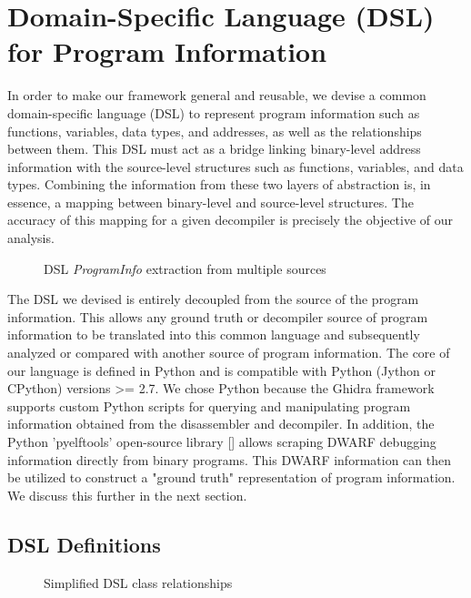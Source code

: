 \section{Domain-Specific Language (DSL) for Program Information}

In order to make our framework general and reusable, we devise a common domain-specific language (DSL) to represent program information such as functions, variables, data types, and addresses, as well as the relationships between them. This DSL must act as a bridge linking binary-level address information with the source-level structures such as functions, variables, and data types. Combining the information from these two layers of abstraction is, in essence, a mapping between binary-level and source-level structures. The accuracy of this mapping for a given decompiler is precisely the objective of our analysis.

\begin{figure}[ht]
    \centering
    \scalebox{0.8}{
        
    }
    \caption{DSL \emph{ProgramInfo} extraction from multiple sources}
    \label{fig:proginfo-sources}
\end{figure}

The DSL we devised is entirely decoupled from the source of the program information. This allows any ground truth or decompiler source of program information to be translated into this common language and subsequently analyzed or compared with another source of program information. The core of our language is defined in Python and is compatible with Python (Jython or CPython) versions >= 2.7. We chose Python because the Ghidra framework supports custom Python scripts for querying and manipulating program information obtained from the disassembler and decompiler. In addition, the Python 'pyelftools' open-source library [] allows scraping DWARF debugging information directly from binary programs. This DWARF information can then be utilized to construct a "ground truth" representation of program information. We discuss this further in the next section.

\subsection{DSL Definitions}

\begin{figure}[ht]
    \centering
    \scalebox{0.4}{
        
    }
    \caption{Simplified DSL class relationships}
    \label{fig:dsl}
\end{figure}

